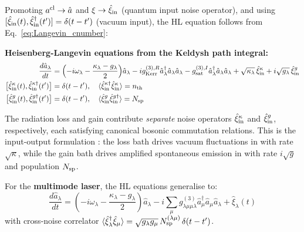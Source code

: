 \documentclass[12pt]{article}
\newcommand{\cl}{{\rm cl}}
\begin{document}
Promoting $a^\cl\to\hat{a}$ and $\xi\to\hat{\xi}_{\rm in}$ (quantum input
noise operator), and using $[\hat{\xi}_{\rm in}(t),\hat{\xi}_{\rm in}^\dagger(t')]
= \delta(t-t')$ (vacuum input), the HL equation follows from
Eq.~\eqref{eq:Langevin_cnumber}:

\begin{keyresult}
\textbf{Heisenberg-Langevin equations from the Keldysh path integral:}
\begin{align}
  \frac{d\hat{a}_\lambda}{dt} &=
  \Bigl(-i\omega_\lambda - \frac{\kappa_\lambda-g_\lambda}{2}\Bigr)\hat{a}_\lambda
  - ig^{(3),R}_{\rm Kerr}\hat{a}_\lambda^\dagger\hat{a}_\lambda\hat{a}_\lambda
  - g^{(3),I}_{\rm sat}\hat{a}_\lambda^\dagger\hat{a}_\lambda\hat{a}_\lambda
  + \sqrt{\kappa_\lambda}\,\hat{\xi}^\kappa_{\rm in}
  + i\sqrt{g_\lambda}\,\hat{\xi}^g_{\rm in}
  \label{eq:HL_derived}\\
  \bigl[\hat{\xi}^\kappa_{\rm in}(t),\hat{\xi}^{\kappa\dagger}_{\rm in}(t')\bigr]
  &= \delta(t-t'),\quad
  \langle\hat{\xi}^{\kappa\dagger}_{\rm in}\hat{\xi}^\kappa_{\rm in}\rangle
  = n_{\rm th}
  \label{eq:kappa_noise}\\
  \bigl[\hat{\xi}^g_{\rm in}(t),\hat{\xi}^{g\dagger}_{\rm in}(t')\bigr]
  &= \delta(t-t'),\quad
  \langle\hat{\xi}^g_{\rm in}\hat{\xi}^{g\dagger}_{\rm in}\rangle
  = N_{\rm sp}
  \label{eq:gain_noise_op}
\end{align}
\end{keyresult}

The radiation loss and gain contribute \emph{separate} noise operators
$\hat{\xi}^\kappa_{\rm in}$ and $\hat{\xi}^g_{\rm in}$, respectively,
each satisfying canonical bosonic commutation relations.  This is the
input-output formulation \cite{Gardiner1985}: the loss bath drives
vacuum fluctuations in with rate $\sqrt{\kappa}$, while the gain bath
drives amplified spontaneous emission in with rate $i\sqrt{g}$ and
population $N_{\rm sp}$.

For the \textbf{multimode laser}, the HL equations generalise to:
\begin{equation}
  \frac{d\hat{a}_\lambda}{dt} =
  \left(-i\omega_\lambda - \frac{\kappa_\lambda-g_\lambda}{2}\right)\hat{a}_\lambda
  - i\sum_\mu g^{(3)}_{\lambda\mu\mu\lambda}
  \hat{a}^\dagger_\mu\hat{a}_\mu\hat{a}_\lambda
  + \hat{\xi}_\lambda(t)
  \label{eq:HL_multimode}
\end{equation}
with cross-noise correlator $\langle\hat{\xi}^\dagger_\lambda\hat{\xi}_\mu\rangle
= \sqrt{g_\lambda g_\mu}\,N_{\rm sp}^{(\lambda\mu)}\,\delta(t-t')$.
\end{document}
